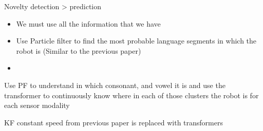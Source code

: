 \begin{frame}{Novelty detection > prediction}
    \begin{itemize}
        \item We must use all the information that we have
        \item Use Particle filter to find the most probable language segments in which the robot is (Similar to the previous paper)
        \item
    \end{itemize}
    
    Use PF to understand in which consonant, and vowel it is and use the transformer to continuously know where in each of those clusters the robot is for each sensor modality
    
    KF constant speed from previous paper is replaced with transformers
\end{frame}